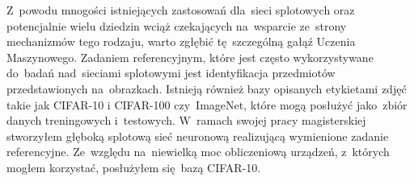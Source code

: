 \documentclass[oneside, 11pt, a4paper]{article}
\begin{document}
\begin{multicols}{2}
Z~powodu mnogości istniejących zastosowań dla~sieci splotowych oraz potencjalnie wielu dziedzin wciąż czekających na~wsparcie ze~strony mechanizmów tego rodzaju, warto zgłębić tę~szczególną gałąź Uczenia Maszynowego. Zadaniem referencyjnym, które jest często wykorzystywane do~badań nad~sieciami splotowymi jest identyfikacja przedmiotów przedstawionych na~obrazkach. Istnieją również bazy opisanych etykietami zdjęć takie jak CIFAR-10 i CIFAR-100\cite{cifar10and100} czy~ImageNet\cite{imagenet}, które mogą posłużyć jako~zbiór danych treningowych i~testowych. W~ramach swojej pracy magisterskiej stworzyłem głęboką splotową sieć neuronową realizującą wymienione zadanie referencyjne. Ze~względu na~niewielką moc obliczeniową urządzeń, z~których mogłem korzystać, posłużyłem się~bazą CIFAR-10.
\vfill
\begin{flushleft}
{}

\end{flushleft}


\end{multicols}
\end{document}
